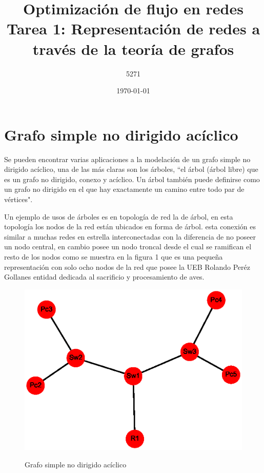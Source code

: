 \documentclass{article}
\title{Optimización de flujo en redes \linebreak 
Tarea 1: Representación de redes a través de la teoría de grafos}
\author{5271}
\date{\today}
\begin{document}
\maketitle
\section{ Grafo simple no dirigido acíclico}
Se pueden encontrar varias aplicaciones a la modelación de un grafo simple no dirigido acíclico, una de las más claras son los árboles, ``el árbol (árbol libre) que es un grafo no dirigido, conexo y acíclico. Un árbol también puede definirse como un grafo no dirigido en el que hay exactamente un camino entre todo par de vértices"\cite{gf1}.

Un ejemplo de usos de árboles es en topología de red la de árbol, en esta topología los nodos de la red están ubicados en forma de árbol. esta conexión es similar a muchas redes en estrella interconectadas con la diferencia de no poseer un nodo central, en cambio posee un nodo troncal desde el cual se ramifican el resto de los nodos como se muestra en la figura 1 que es una pequeña representación con solo ocho nodos de la red que posee la UEB Rolando Peréz Gollanes entidad dedicada al sacrificio y procesamiento de aves.
 
 
\begin{center}

\end{center}
\begin{figure}[h]
\begin{center}
\includegraphics[scale=0.7]{Graf1.eps}\\
\caption{Grafo simple no dirigido acíclico}
\end{center}
\end{figure}
\end{document}
